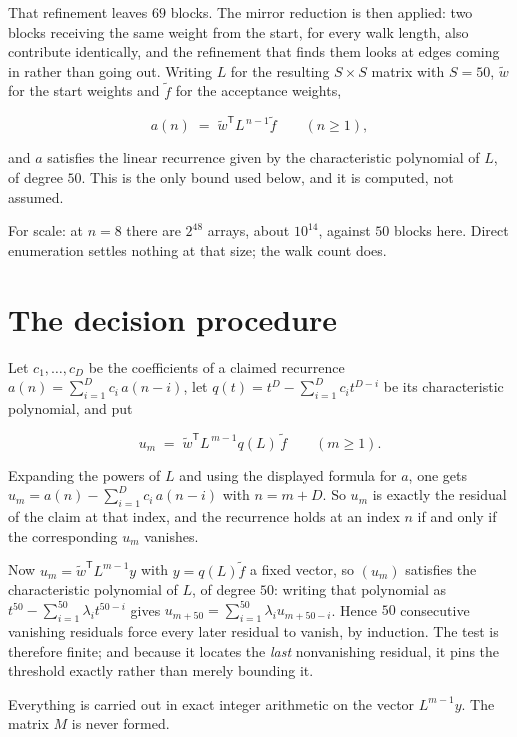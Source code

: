 \documentclass[11pt]{article}
\theoremstyle{definition}
\begin{document}
That refinement leaves $69$ blocks. The mirror reduction is then applied: two blocks receiving the same weight from the start, for every walk length, also contribute identically, and the refinement that finds them looks at edges coming in rather than going out. Writing $L$ for the resulting $S \times S$ matrix with $S = 50$, $\tilde w$ for the start weights and $\tilde f$ for the acceptance weights,

\[a(n) \;=\; \tilde w^{\mathsf T} L^{\,n-1} \tilde f \qquad (n \ge 1),\]

and $a$ satisfies the linear recurrence given by the characteristic polynomial of $L$, of degree $50$. This is the only bound used below, and it is computed, not assumed.

For scale: at $n = 8$ there are $2^{48}$ arrays, about $10^{14}$, against $50$ blocks here. Direct enumeration settles nothing at that size; the walk count does.

\section{The decision procedure}

Let $c_1,\dots,c_D$ be the coefficients of a claimed recurrence $a(n) = \sum_{i=1}^{D} c_i\,a(n-i)$, let $q(t) = t^{D} - \sum_{i=1}^{D} c_i t^{D-i}$ be its characteristic polynomial, and put

\[u_m \;=\; \tilde w^{\mathsf T} L^{\,m-1} q(L)\,\tilde f \qquad (m \ge 1).\]

Expanding the powers of $L$ and using the displayed formula for $a$, one gets $u_m = a(n) - \sum_{i=1}^{D} c_i\,a(n-i)$ with $n = m + D$. So $u_m$ is exactly the residual of the claim at that index, and the recurrence holds at an index $n$ if and only if the corresponding $u_m$ vanishes.

Now $u_m = \tilde w^{\mathsf T} L^{m-1} y$ with $y = q(L)\tilde f$ a fixed vector, so $(u_m)$ satisfies the characteristic polynomial of $L$, of degree $50$: writing that polynomial as $t^{50} - \sum_{i=1}^{50} \lambda_i t^{50-i}$ gives $u_{m+50} = \sum_{i=1}^{50} \lambda_i u_{m+50-i}$. Hence $50$ consecutive vanishing residuals force every later residual to vanish, by induction. The test is therefore finite; and because it locates the {\itshape last} nonvanishing residual, it pins the threshold exactly rather than merely bounding it.

Everything is carried out in exact integer arithmetic on the vector $L^{m-1}y$. The matrix $M$ is never formed.
\end{document}
